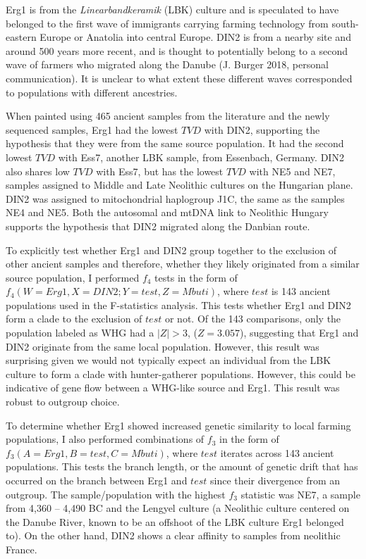 Erg1 is from the \textit{Linearbandkeramik} (LBK) culture and is speculated to have belonged to the first wave of immigrants carrying farming technology from south-eastern Europe or Anatolia into central Europe. DIN2 is from a nearby site and around 500 years more recent, and is thought to potentially belong to a second wave of farmers who migrated along the Danube (J. Burger 2018, personal communication). It is unclear to what extent these different waves corresponded to populations with different ancestries.  

When painted using 465 ancient samples from the literature and the newly sequenced samples, Erg1 had the lowest $TVD$ with DIN2, supporting the hypothesis that they were from the same source population. It had the second lowest $TVD$ with Ess7, another LBK sample, from Essenbach, Germany. DIN2 also shares low $TVD$ with Ess7, but has the lowest $TVD$ with NE5 and NE7, samples assigned to Middle and Late Neolithic cultures on the Hungarian plane. DIN2 was assigned to mitochondrial haplogroup J1C, the same as the samples NE4 and NE5. Both the autosomal and mtDNA link to Neolithic Hungary supports the hypothesis that DIN2 migrated along the Danbian route.   

To explicitly test whether Erg1 and DIN2 group together to the exclusion of other ancient samples and therefore, whether they likely originated from a similar source population, I performed $f_{4}$ tests in the form of $f_{4}(W=Erg1, X=DIN2; Y=test, Z=Mbuti)$, where $test$ is 143 ancient populations used in the F-statistics analysis. This tests whether Erg1 and DIN2 form a clade to the exclusion of $test$ or not. Of the 143 comparisons, only the population labeled as WHG had a $|Z|>3$, ($Z=3.057$), suggesting that Erg1 and DIN2 originate from the same local population. However, this result was surprising given we would not typically expect an individual from the LBK culture to form a clade with hunter-gatherer populations. However, this could be indicative of gene flow between a WHG-like source and Erg1. This result was robust to outgroup choice.  

To determine whether Erg1 showed increased genetic similarity to local farming populations, I also performed combinations of $f_{3}$ in the form of $f_{3}(A=Erg1, B=test, C=Mbuti)$, where $test$ iterates across 143 ancient populations. This tests the branch length, or the amount of genetic drift that has occurred on the branch between Erg1 and $test$ since their divergence from an outgroup. The sample/population with the highest $f_{3}$ statistic was NE7, a sample from 4,360 – 4,490 BC and the Lengyel culture (a Neolithic culture centered on the Danube River, known to be an offshoot of the LBK culture Erg1 belonged to). On the other hand, DIN2 shows a clear affinity to samples from neolithic France.

